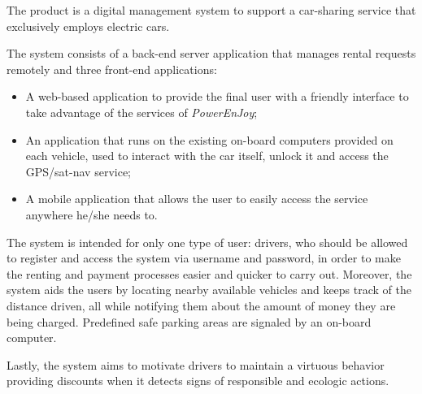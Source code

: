 The product is a digital management system to support a car-sharing service that exclusively employs electric cars.

The system consists of a back-end server application that manages rental requests remotely and three front-end applications:

\begin{itemize}
\item A web-based application to provide the final user with a friendly interface to take advantage of the services of \hbox{\emph{PowerEnJoy}};
\item An application that runs on the existing on-board computers provided on each vehicle, used to interact with the car itself, unlock it and access the GPS/sat-nav service;
\item A mobile application that allows the user to easily access the service anywhere he/she needs to.
\end{itemize}
The system is intended for only one type of user: drivers, who should be allowed to register and access the system via username and password, in order to make the renting and payment processes easier and quicker to carry out. Moreover, the system aids the users by locating nearby available vehicles and keeps track of the distance driven, all while notifying them about the amount of money they are being charged. Predefined safe parking areas are signaled by an on-board computer.

Lastly, the system aims to motivate drivers to maintain a virtuous behavior providing discounts when it detects signs of responsible and ecologic actions.
